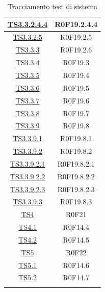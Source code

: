 \documentclass[../PianoDiQualifica.tex]{subfiles}
\begin{document}
\begin{longtable}{|c|c|}
		\hyperlink{TS3.3.2.4.4}{TS3.3.2.4.4} & R0F19.2.4.4   \\
		\hline
		\hyperlink{TS3.3.2.5}{TS3.3.2.5} & R0F19.2.5   \\
		\hline
		\hyperlink{TS3.3.3}{TS3.3.3} & R0F19.2.6   \\
		\hline
		\hyperlink{TS3.3.4}{TS3.3.4} & R0F19.3   \\
		\hline
		\hyperlink{TS3.3.5}{TS3.3.5} & R0F19.4   \\
		\hline
		\hyperlink{TS3.3.6}{TS3.3.6} & R0F19.5   \\
		\hline
		\hyperlink{TS3.3.7}{TS3.3.7} & R0F19.6   \\
		\hline
		\hyperlink{TS3.3.8}{TS3.3.8} & R0F19.7   \\
		\hline
		\hyperlink{TS3.3.9}{TS3.3.9} & R0F19.8   \\
		\hline
		\hyperlink{TS3.3.9.1}{TS3.3.9.1} & R0F19.8.1   \\
		\hline
		\hyperlink{TS3.3.9.2}{TS3.3.9.2} & R0F19.8.2   \\
		\hline
		\hyperlink{TS3.3.9.2.1}{TS3.3.9.2.1} & R0F19.8.2.1   \\
		\hline
		\hyperlink{TS3.3.9.2.2}{TS3.3.9.2.2} & R0F19.8.2.2   \\
		\hline
		\hyperlink{TS3.3.9.2.3}{TS3.3.9.2.3} & R0F19.8.2.3   \\
		\hline
		\hyperlink{TS3.3.9.3}{TS3.3.9.3} & R0F19.8.3   \\
		\hline
		\hyperlink{TS4}{TS4} & R0F21   \\
		\hline
		\hyperlink{TS4.1}{TS4.1} & R0F14.4   \\
		\hline
		\hyperlink{TS4.2}{TS4.2} & R0F14.5   \\
		\hline
		\hyperlink{TS5}{TS5} & R0F22   \\
		\hline
		\hyperlink{TS5.1}{TS5.1} & R0F14.6   \\
		\hline
		\hyperlink{TS5.2}{TS5.2} & R0F14.7   \\
		\hline
		\caption[Tracciamento test di sistema]{Tracciamento test di sistema}
		\label{tabella:TracciamentoTestSistema}
	\end{longtable}
	
\newpage
\end{document}

